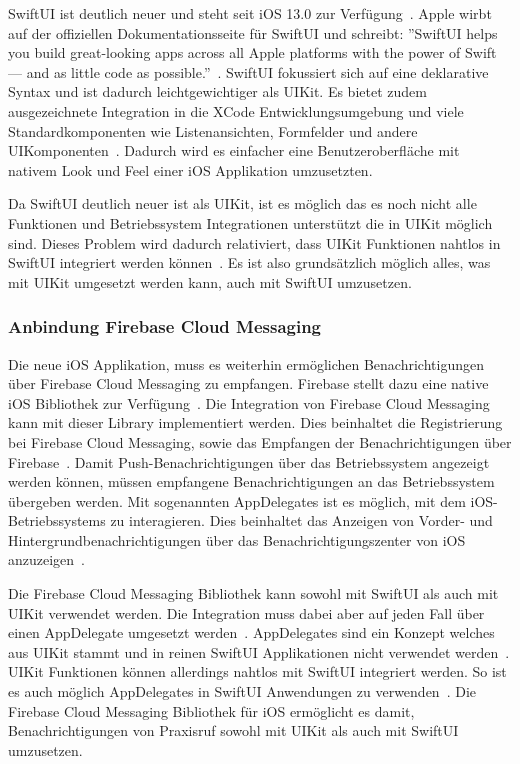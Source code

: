 SwiftUI ist deutlich neuer und steht seit iOS 13.0 zur Verfügung~\cite{ios_swift_ui}.
Apple wirbt auf der offiziellen Dokumentationsseite für SwiftUI und schreibt: ''SwiftUI helps you build great-looking apps across all Apple platforms with the power of Swift — and as little code as possible.''~\cite{ios_swift_ui}.
SwiftUI fokussiert sich auf eine deklarative Syntax und ist dadurch leichtgewichtiger als UIKit.
Es bietet zudem ausgezeichnete Integration in die XCode Entwicklungsumgebung und viele Standardkomponenten wie Listenansichten, Formfelder und andere UIKomponenten~\cite{ios_swift_ui}.
Dadurch wird es einfacher eine Benutzeroberfläche mit nativem Look und Feel einer iOS Applikation umzusetzten.

Da SwiftUI deutlich neuer ist als UIKit, ist es möglich das es noch nicht alle Funktionen und Betriebssystem Integrationen unterstützt die in UIKit möglich sind.
Dieses Problem wird dadurch relativiert, dass UIKit Funktionen nahtlos in SwiftUI integriert werden können~\cite{ios_swift_ui_uikit}.
Es ist also grundsätzlich möglich alles, was mit UIKit umgesetzt werden kann, auch mit SwiftUI umzusetzen.

\clearpage

\subsubsection{Anbindung Firebase Cloud Messaging}

Die neue iOS Applikation, muss es weiterhin ermöglichen Benachrichtigungen über Firebase Cloud Messaging zu empfangen.
Firebase stellt dazu eine native iOS Bibliothek zur Verfügung~\cite{firebase_github_ios}.
Die Integration von Firebase Cloud Messaging kann mit dieser Library implementiert werden.
Dies beinhaltet die Registrierung bei Firebase Cloud Messaging, sowie das Empfangen der Benachrichtigungen über Firebase~\cite{firebase_ios}.
Damit Push-Benachrichtigungen über das Betriebssystem angezeigt werden können, müssen empfangene Benachrichtigungen an das Betriebssystem übergeben werden.
Mit sogenannten AppDelegates ist es möglich, mit dem iOS-Betriebssystems zu interagieren.
Dies beinhaltet das Anzeigen von Vorder- und Hintergrundbenachrichtigungen über das Benachrichtigungszenter von iOS anzuzeigen~\cite{ios_app_delegate}.

Die Firebase Cloud Messaging Bibliothek kann sowohl mit SwiftUI als auch mit UIKit verwendet werden.
Die Integration muss dabei aber auf jeden Fall über einen AppDelegate umgesetzt werden~\cite{firebase_ios}.
AppDelegates sind ein Konzept welches aus UIKit stammt und in reinen SwiftUI Applikationen nicht verwendet werden~\cite{ios_app_delegate}.
UIKit Funktionen können allerdings nahtlos mit SwiftUI integriert werden.
So ist es auch möglich AppDelegates in SwiftUI Anwendungen zu verwenden~\cite{ios_swift_ui_uikit}.
Die Firebase Cloud Messaging Bibliothek für iOS ermöglicht es damit, Benachrichtigungen von Praxisruf sowohl mit UIKit als auch mit SwiftUI umzusetzen.

